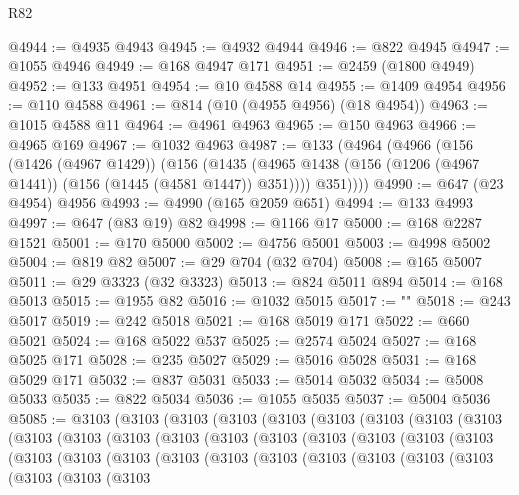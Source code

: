 \begin{lexlean}{R82}
\begin{coremodule}
@4944 := @4935 @4943
@4945 := @4932 @4944
@4946 := @822 @4945
@4947 := @1055 @4946
@4949 := @168 @4947 @171
@4951 := @2459 (@1800 @4949)
@4952 := @133 @4951
@4954 := @10 @4588 @14
@4955 := @1409 @4954
@4956 := @110 @4588
@4961 := @814 (@10 (@4955 @4956) (@18 @4954))
@4963 := @1015 @4588 @11
@4964 := @4961 @4963
@4965 := @150 @4963
@4966 := @4965 @169
@4967 := @1032 @4963
@4987 := @133
    (@4964
      (@4966
        (@156
          (@1426 (@4967 @1429))
          (@156
            (@1435 (@4965 @1438 (@156 (@1206 (@4967 @1441)) (@156 (@1445 (@4581 @1447)) @351))))
            @351))))
@4990 := @647 (@23 @4954) @4956
@4993 := @4990 (@165 @2059 @651)
@4994 := @133 @4993
@4997 := @647 (@83 @19) @82
@4998 := @1166 @17
@5000 := @168 @2287 @1521
@5001 := @170 @5000
@5002 := @4756 @5001
@5003 := @4998 @5002
@5004 := @819 @82
@5007 := @29 @704 (@32 @704)
@5008 := @165 @5007
@5011 := @29 @3323 (@32 @3323)
@5013 := @824 @5011 @894
@5014 := @168 @5013
@5015 := @1955 @82
@5016 := @1032 @5015
@5017 := "\n"
@5018 := @243 @5017
@5019 := @242 @5018
@5021 := @168 @5019 @171
@5022 := @660 @5021
@5024 := @168 @5022 @537
@5025 := @2574 @5024
@5027 := @168 @5025 @171
@5028 := @235 @5027
@5029 := @5016 @5028
@5031 := @168 @5029 @171
@5032 := @837 @5031
@5033 := @5014 @5032
@5034 := @5008 @5033
@5035 := @822 @5034
@5036 := @1055 @5035
@5037 := @5004 @5036
@5085 := @3103
    (@3103
      (@3103
        (@3103
          (@3103
            (@3103
              (@3103
                (@3103
                  (@3103
                    (@3103
                      (@3103
                        (@3103
                          (@3103
                            (@3103
                              (@3103
                                (@3103
                                  (@3103
                                    (@3103
                                      (@3103
                                        (@3103
                                          (@3103
                                            (@3103
                                              (@3103
                                                (@3103
                                                  (@3103
                                                    (@3103
                                                      (@3103
                                                        (@3103
                                                          (@3103
                                                            (@3103
                                                              (@3103
                                                                (@3103

\end{coremodule}
\end{lexlean}
